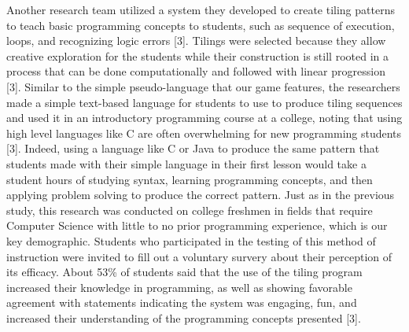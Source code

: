 Another research team utilized a system they developed to create tiling patterns to teach 
basic programming concepts to students, such as sequence of execution, loops, and 
recognizing logic errors [3]. Tilings were selected because they allow creative 
exploration for the students while their construction is still rooted in a process that can 
be done computationally and followed with linear progression [3]. Similar to the simple 
pseudo-language that our game features, the researchers made a simple text-based 
language for students to use to produce tiling sequences and used it in an introductory 
programming course at a college, noting that using high level languages like C are often
overwhelming for new programming students [3]. Indeed, using a language like C or 
Java to produce the same pattern that students made with their simple language in their 
first lesson would take a student hours of studying syntax, learning programming 
concepts, and then applying problem solving to produce the correct pattern. Just as in 
the previous study, this research was conducted on college freshmen in fields that 
require Computer Science with little to no prior programming experience, which is our 
key demographic. Students who participated in the testing of this method of instruction 
were invited to fill out a voluntary survery about their perception of its efficacy. About 
53\% of students said that the use of the tiling program increased their knowledge in 
programming, as well as showing favorable agreement with statements indicating the 
system was engaging, fun, and increased their understanding of the programming 
concepts presented [3].\\

